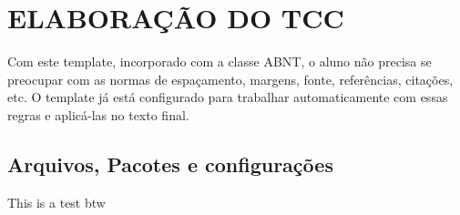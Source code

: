 \chapter{ELABORAÇÃO DO TCC}
Com este template, incorporado com a classe ABNT, o aluno não precisa se preocupar com as normas de espaçamento, margens, fonte, referências, citações, etc. O template já está configurado para trabalhar automaticamente com essas regras e aplicá-las no texto final.
\section{Arquivos, Pacotes e configurações}
This is a test btw 

\cite{@basakDynamicHedgingIncomplete2012}